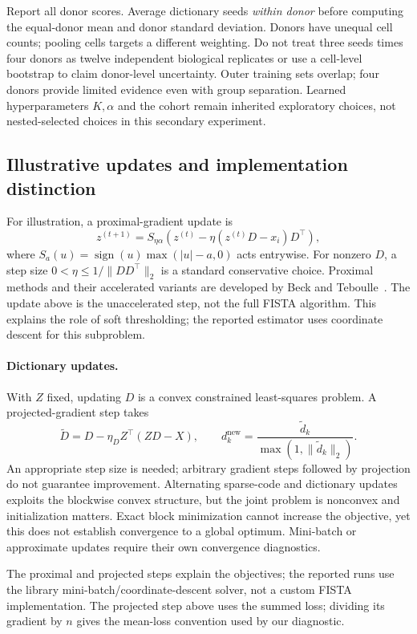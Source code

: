 Report all donor scores. Average dictionary seeds \emph{within donor} before computing the equal-donor mean and donor standard deviation. Donors have unequal cell counts; pooling cells targets a different weighting. Do not treat three seeds times four donors as twelve independent biological replicates or use a cell-level bootstrap to claim donor-level uncertainty. Outer training sets overlap; four donors provide limited evidence even with group separation. Learned hyperparameters $K,\alpha$ and the cohort remain inherited exploratory choices, not nested-selected choices in this secondary experiment.


\subsection{Illustrative updates and implementation distinction}
For illustration, a proximal-gradient update is
\[
z^{(t+1)}=S_{\eta\alpha}\!\left(z^{(t)}-\eta(z^{(t)}D-x_i)D^\top\right),
\]
where $S_a(u)=\operatorname{sign}(u)\max(|u|-a,0)$ acts entrywise. For nonzero $D$, a step size $0<\eta\leq1/\lVert DD^\top\rVert_2$ is a standard conservative choice. Proximal methods and their accelerated variants are developed by Beck and Teboulle~\cite{beck2009}. The update above is the unaccelerated step, not the full FISTA algorithm. This explains the role of soft thresholding; the reported estimator uses coordinate descent for this subproblem.

\paragraph{Dictionary updates.}
With $Z$ fixed, updating $D$ is a convex constrained least-squares problem. A projected-gradient step takes
\[
\widetilde D=D-\eta_D Z^\top(ZD-X),\qquad
 d_k^{\mathrm{new}}=\frac{\widetilde d_k}{\max(1,\lVert\widetilde d_k\rVert_2)}.
\]
An appropriate step size is needed; arbitrary gradient steps followed by projection do not guarantee improvement. Alternating sparse-code and dictionary updates exploits the blockwise convex structure, but the joint problem is nonconvex and initialization matters. Exact block minimization cannot increase the objective, yet this does not establish convergence to a global optimum. Mini-batch or approximate updates require their own convergence diagnostics.


The proximal and projected steps explain the objectives; the reported runs
use the library mini-batch/coordinate-descent solver, not a custom FISTA
implementation. The projected step above uses the summed loss; dividing its
gradient by $n$ gives the mean-loss convention used by our diagnostic.

